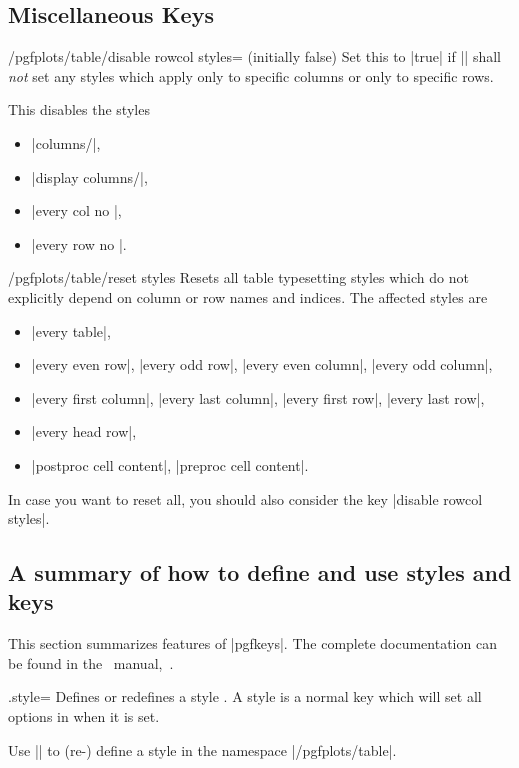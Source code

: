 \subsection{Miscellaneous Keys}
\begin{key}{/pgfplots/table/disable rowcol styles= (initially false)}
	Set this to |true| if |\pgfplotstabletypeset| shall \emph{not} set any styles which apply only to specific columns or only to specific rows.

	This disables the styles
	\begin{itemize}
		\item |columns/|,
		\item |display columns/|,
		\item |every col no |,
		\item |every row no |.
	\end{itemize}
\end{key}

\begin{key}{/pgfplots/table/reset styles}
	Resets all table typesetting styles which do not explicitly depend on column or row names and indices. The affected styles are
	\begin{itemize}
		\item |every table|,
		\item |every even row|, |every odd row|, |every even column|, |every odd column|,
		\item |every first column|, |every last column|, |every first row|, |every last row|,
		\item |every head row|,
		\item |postproc cell content|, |preproc cell content|.
	\end{itemize}
	In case you want to reset all, you should also consider the key |disable rowcol styles|.
\end{key}

\subsection{A summary of how to define and use styles and keys}
This section summarizes features of |pgfkeys|. The complete documentation can be found in the \pgfname\ manual,~\cite{tikz}.
\begin{handler}{{.style}=}
	Defines or redefines a style . A style is a normal key which will set all options in  when it is set.

	Use	|| to (re-) define a style  in the namespace |/pgfplots/table|.
\end{handler}

